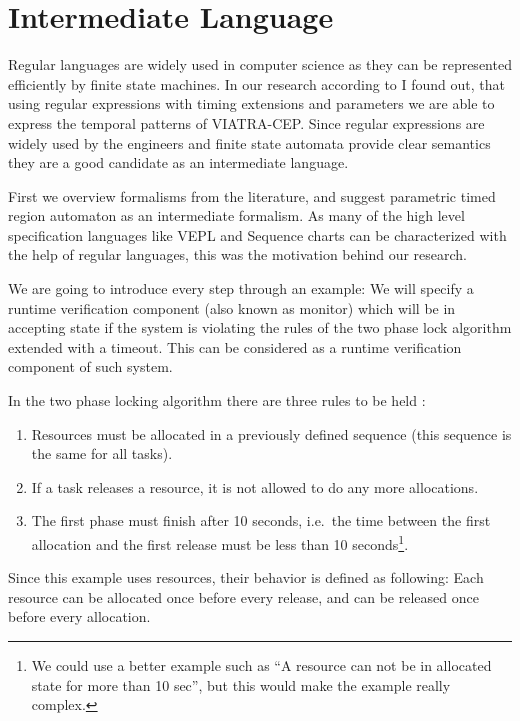 \chapter{Intermediate Language}
	\label{chap:cep}

		Regular languages are widely used in computer science as they can be represented efficiently by finite state machines.		
		In our research according to \citep{davidi} I found out, that using regular expressions with timing extensions and parameters we are able to express the temporal patterns of VIATRA-CEP.
		Since regular expressions are widely used by the engineers and finite state automata provide clear semantics they are a good candidate as an intermediate language.

		First we overview formalisms from the literature, and suggest parametric timed region automaton as an intermediate formalism.
		As many of the high level specification languages like VEPL and Sequence charts can be characterized with the help of regular languages,
		this was the motivation behind our research.%
		
		We are going to introduce every step through an example: 
		We will specify a runtime verification component (also known as monitor) which will be in accepting state if the system is violating the rules of the two phase lock algorithm extended with a timeout. %
		This can be considered as a runtime verification component of such system.

		In the two phase locking algorithm there are three rules to be held :
		\begin{enumerate}
			\item Resources must be allocated in a previously defined sequence (this sequence is the same for all tasks).
			\item If a task releases a resource, it is not allowed to do any more allocations.
			\item The first phase must finish after 10 seconds, i.e.~the time between the first allocation and the first release must be less than 10 seconds\footnote{We could use a better example such as ``A resource can not be in allocated state for more than 10 sec'', but this would make the example really complex.}. 
		\end{enumerate}
		
		Since this example uses resources, their behavior is defined as following:
		Each resource can be allocated once before every release, and can be released once before every allocation.

